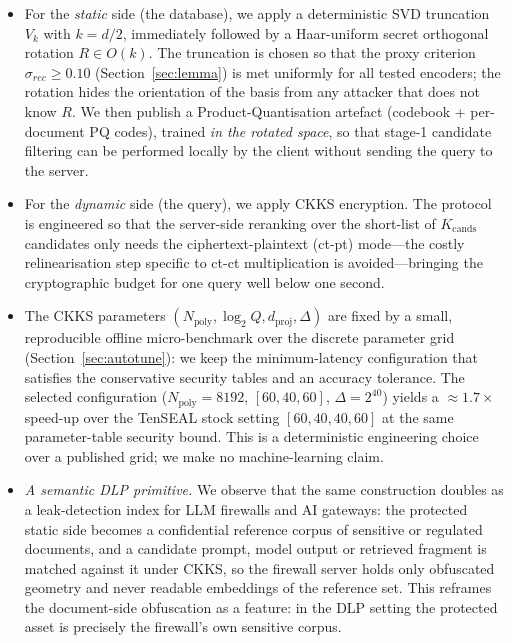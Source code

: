 \documentclass[11pt,a4paper]{article}
\begin{document}
\begin{itemize}[leftmargin=18pt]
\item For the \emph{static} side (the database), we apply a deterministic
SVD truncation $V_k$ with $k = d/2$, immediately followed by a Haar-uniform
secret orthogonal rotation $R \in O(k)$. The truncation is chosen so that
the proxy criterion $\sigma_{rec} \geq 0.10$ (Section~\ref{sec:lemma}) is
met uniformly for all tested encoders; the rotation hides the orientation
of the basis from any attacker that does not know $R$. We then publish
a Product-Quantisation artefact (codebook + per-document PQ codes), trained
\emph{in the rotated space}, so that stage-1 candidate filtering can be
performed locally by the client without sending the query to the server.

\item For the \emph{dynamic} side (the query), we apply CKKS encryption.
The protocol is engineered so that the server-side reranking over the
short-list of $K_{\mathrm{cands}}$ candidates only needs the
ciphertext-plaintext (ct-pt) mode---the costly relinearisation step
specific to ct-ct multiplication is avoided---bringing the cryptographic
budget for one query well below one second.

\item The CKKS parameters
$(N_{\mathrm{poly}}, \log_2 Q, d_{\mathrm{proj}}, \Delta)$ are fixed by a
small, reproducible offline micro-benchmark over the discrete parameter grid
(Section~\ref{sec:autotune}): we keep the minimum-latency configuration that
satisfies the conservative security tables and an accuracy tolerance. The
selected configuration ($N_{\mathrm{poly}} = 8192$, $[60, 40, 60]$,
$\Delta = 2^{40}$) yields a $\approx 1.7\times$ speed-up over the TenSEAL
stock setting $[60,40,40,60]$ at the same parameter-table security bound.
This is a deterministic engineering choice over a published grid; we make no
machine-learning claim.

\item \emph{A semantic DLP primitive.} We observe that the same
construction doubles as a leak-detection index for LLM firewalls and AI
gateways: the protected static side becomes a confidential reference
corpus of sensitive or regulated documents, and a candidate prompt, model
output or retrieved fragment is matched against it under CKKS, so the
firewall server holds only obfuscated geometry and never readable
embeddings of the reference set. This reframes the document-side
obfuscation as a feature: in the DLP setting the protected asset is
precisely the firewall's own sensitive corpus.
\end{itemize}
\end{document}
